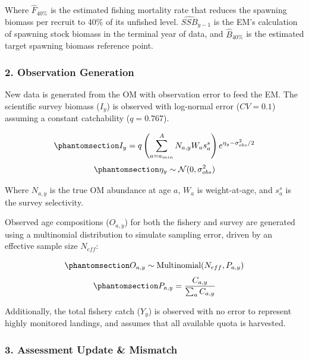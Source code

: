 \documentclass[
  authoryear,
  preprint,
  3p]{elsarticle}
\begin{document}
Where \(\hat{F}_{40\%}\) is the estimated fishing mortality rate that
reduces the spawning biomass per recruit to 40\% of its unfished level.
\(\hat{SSB}_{y-1}\) is the EM's calculation of spawning stock biomass in
the terminal year of data, and \(\hat{B}_{40\%}\) is the estimated
target spawning biomass reference point.

\subsubsection{2. Observation Generation}\label{observation-generation}

New data is generated from the OM with observation error to feed the EM.
The scientific survey biomass (\(I_y\)) is observed with log-normal
error (\(CV = 0.1\)) assuming a constant catchability (\(q = 0.767\)).

\begin{equation}\protect\phantomsection\label{eq-obs}{
I_y = q \left( \sum_{a=a_{min}}^{A} N_{a,y} W_a s_a^{s} \right) e^{\eta_y - \sigma_{obs}^2/2}
}\end{equation}
\begin{equation}\protect\phantomsection\label{eq-obs-error}{
\eta_y \sim \mathcal{N}(0, \sigma_{obs}^2)
}\end{equation}

Where \(N_{a,y}\) is the true OM abundance at age \(a\), \(W_a\) is
weight-at-age, and \(s_a^s\) is the survey selectivity.

Observed age compositions (\(O_{a,y}\)) for both the fishery and survey
are generated using a multinomial distribution to simulate sampling
error, driven by an effective sample size \(N_{eff}\):

\begin{equation}\protect\phantomsection\label{eq-comp}{
O_{a,y} \sim \text{Multinomial}(N_{eff}, P_{a,y})
}\end{equation}
\begin{equation}\protect\phantomsection\label{eq-p-comp}{
P_{a,y} = \frac{C_{a,y}}{\sum_a C_{a,y}}
}\end{equation}

Additionally, the total fishery catch (\(Y_y\)) is observed with no
error to represent highly monitored landings, and assumes that all
available quota is harvested.

\subsubsection{3. Assessment Update \&
Mismatch}\label{assessment-update-mismatch}
\end{document}
